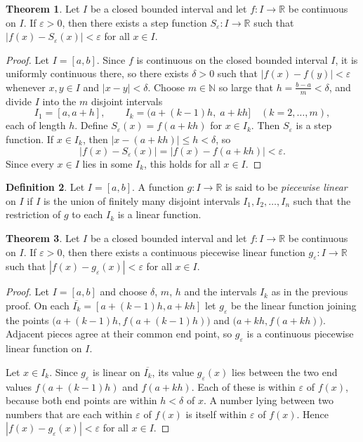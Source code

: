 \documentclass[11pt,a4paper]{article}
\numberwithin{equation}{section}
\theoremstyle{definition}
\newtheorem{thm}{Theorem}[subsection]
\newtheorem{defn}[thm]{Definition}
\begin{document}
\begin{thm}
Let $I$ be a closed bounded interval and let $f: I \longrightarrow \mathbb{R}$ be continuous on $I$. If $\varepsilon > 0$, then there exists a step function $S_{\varepsilon}: I\longrightarrow \mathbb{R}$ such that $|f(x) - S_{\varepsilon}(x)| < \varepsilon$ for all $x\in I$.
\end{thm}

\begin{proof}
Let $I=[a,b]$. Since $f$ is continuous on the closed bounded interval $I$, it is uniformly continuous there, so there exists $\delta> 0$ such that $|f(x) - f(y)| < \varepsilon$ whenever $x, y\in I$ and $|x - y| < \delta$. Choose $m\in \mathbb{N}$ so large that $h = \frac{b - a}{m} < \delta$, and divide $I$ into the $m$ disjoint intervals
$$I_1 = [a, a+h], \qquad I_k = \bigl(a + (k-1)h,\; a + kh\bigr] \quad (k = 2, \dots , m),$$
each of length $h$. Define $S_{\varepsilon}(x) = f(a + kh)$ for $x\in I_k$. Then $S_{\varepsilon}$ is a step function. If $x\in I_k$, then $|x - (a+kh)|\leq h < \delta$, so
$$|f(x) - S_{\varepsilon}(x)| = |f(x) - f(a + kh)| < \varepsilon .$$
Since every $x\in I$ lies in some $I_k$, this holds for all $x\in I$.
\end{proof}


\begin{defn}
Let $I = [a,b]$. A function $g: I \longrightarrow \mathbb{R}$ is said to be \emph{piecewise linear} on $I$ if $I$ is the union of finitely many disjoint intervals $I_1, I_2, \dots, I_n$ such that the restriction of $g$ to each $I_k$ is a linear function.
\end{defn}


\begin{thm}
Let $I$ be a closed bounded interval and let $f: I\longrightarrow \mathbb{R}$ be continuous on $I$. If $\varepsilon >0$, then there exists a continuous piecewise linear function $g_{\varepsilon}: I \longrightarrow \mathbb{R}$ such that $|f(x) - g_{\varepsilon}(x)|  < \varepsilon$ for all $x\in I$.
\end{thm}

\begin{proof}
Let $I=[a,b]$ and choose $\delta$, $m$, $h$ and the intervals $I_k$ as in the previous proof. On each $\overline{I_k} = [a + (k - 1)h, a + kh]$ let $g_{\varepsilon}$ be the linear function joining the points $\bigl(a + (k - 1)h, f(a + (k - 1)h)\bigr)$ and $\bigl(a + kh, f(a + kh)\bigr)$. Adjacent pieces agree at their common end point, so $g_{\varepsilon}$ is a continuous piecewise linear function on $I$.

Let $x\in I_k$. Since $g_{\varepsilon}$ is linear on $\overline{I_k}$, its value $g_{\varepsilon}(x)$ lies between the two end values $f(a + (k - 1)h)$ and $f(a + kh)$. Each of these is within $\varepsilon$ of $f(x)$, because both end points are within $h<\delta$ of $x$. A number lying between two numbers that are each within $\varepsilon$ of $f(x)$ is itself within $\varepsilon$ of $f(x)$. Hence $|f(x) - g_{\varepsilon}(x)| < \varepsilon$ for all $x\in I$.
\end{proof}
\end{document}
